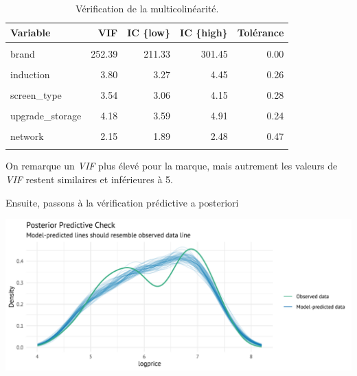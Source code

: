 \documentclass[
  12pt,
]{report}
\begin{document}
\begin{table}[!h]
\centering
\caption{\label{tab:collinearity_log}Vérification de la multicolinéarité.}
\centering
\begin{tabular}[t]{lrrrr}
\toprule
\textbf{Variable} & \textbf{VIF} & \textbf{IC \{low\}} & \textbf{IC \{high\}} & \textbf{Tolérance}\\
\midrule
\cellcolor{gray!10}{storage} & \cellcolor{gray!10}{1.90} & \cellcolor{gray!10}{1.68} & \cellcolor{gray!10}{2.18} & \cellcolor{gray!10}{0.53}\\
brand & 252.39 & 211.33 & 301.45 & 0.00\\
\cellcolor{gray!10}{ram} & \cellcolor{gray!10}{3.68} & \cellcolor{gray!10}{3.17} & \cellcolor{gray!10}{4.31} & \cellcolor{gray!10}{0.27}\\
induction & 3.80 & 3.27 & 4.45 & 0.26\\
\cellcolor{gray!10}{screen\_size} & \cellcolor{gray!10}{1.62} & \cellcolor{gray!10}{1.45} & \cellcolor{gray!10}{1.86} & \cellcolor{gray!10}{0.62}\\
\addlinespace
screen\_type & 3.54 & 3.06 & 4.15 & 0.28\\
\cellcolor{gray!10}{made\_in} & \cellcolor{gray!10}{23.23} & \cellcolor{gray!10}{19.54} & \cellcolor{gray!10}{27.67} & \cellcolor{gray!10}{0.04}\\
upgrade\_storage & 4.18 & 3.59 & 4.91 & 0.24\\
\cellcolor{gray!10}{das\_limbs} & \cellcolor{gray!10}{2.06} & \cellcolor{gray!10}{1.81} & \cellcolor{gray!10}{2.37} & \cellcolor{gray!10}{0.49}\\
network & 2.15 & 1.89 & 2.48 & 0.47\\
\addlinespace
\cellcolor{gray!10}{ppi} & \cellcolor{gray!10}{2.89} & \cellcolor{gray!10}{2.51} & \cellcolor{gray!10}{3.37} & \cellcolor{gray!10}{0.35}\\
\bottomrule
\end{tabular}
\end{table}

On remarque un \emph{VIF} plus élevé pour la marque, mais autrement les
valeurs de \emph{VIF} restent similaires et inférieures à 5.

Ensuite, passons à la vérification prédictive a posteriori

\begin{center}
\includegraphics{report_files/figure-pdf/posterior_log-1.pdf}
\end{center}
\end{document}
